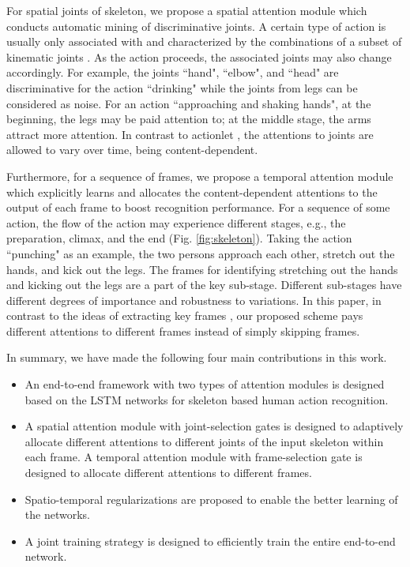 \documentclass[letterpaper]{article}
\begin{document}
For spatial joints of skeleton, we propose a spatial attention module which conducts automatic mining of discriminative joints. A certain type of action is usually only associated with and characterized by the combinations of a subset of kinematic joints \cite{CVPR12Actionlet}. As the action proceeds, the associated joints may also change accordingly. For example, the joints ``hand", ``elbow", and ``head" are discriminative for the action ``drinking" while the joints from legs can be considered as noise. For an action ``approaching and shaking hands", at the beginning, the legs may be paid attention to; at the middle stage, the arms attract more attention. In contrast to actionlet \cite{CVPR12Actionlet}, the attentions to joints are allowed to vary over time, being content-dependent.


Furthermore, for a sequence of frames, we propose a temporal attention module which explicitly learns and allocates the content-dependent attentions to the output of each frame to boost recognition performance. For a sequence of some action, the flow of the action may experience different stages, e.g., the preparation, climax, and the end (Fig. \ref{fig:skeleton}). Taking the action ``punching" as an example, the two persons approach each other, stretch out the hands, and kick out the legs. The frames for identifying stretching out the hands and kicking out the legs are a part of the key sub-stage. Different sub-stages have different degrees of importance and robustness to variations. In this paper, in contrast to the ideas of extracting key frames \cite{carlsson2001action,BMVC08Information}, our proposed scheme pays different attentions to different frames instead of simply skipping frames.




In summary, we have made the following four main contributions in this work.
\begin{itemize}
\setlength{\itemsep}{0pt}\item An end-to-end framework with two types of attention modules is designed based on the LSTM networks for skeleton based human action recognition.

\setlength{\parsep}{0pt}\item A spatial attention module with joint-selection gates is designed to adaptively allocate different attentions to different joints of the input skeleton within each frame. A temporal attention module with frame-selection gate is designed to allocate different attentions to different frames.

\setlength{\parskip}{0pt}\item Spatio-temporal regularizations are proposed to enable the better learning of the networks.


\setlength{\parskip}{0pt}\item A joint training strategy is designed to efficiently train the entire end-to-end network.
\end{itemize}
\end{document}
